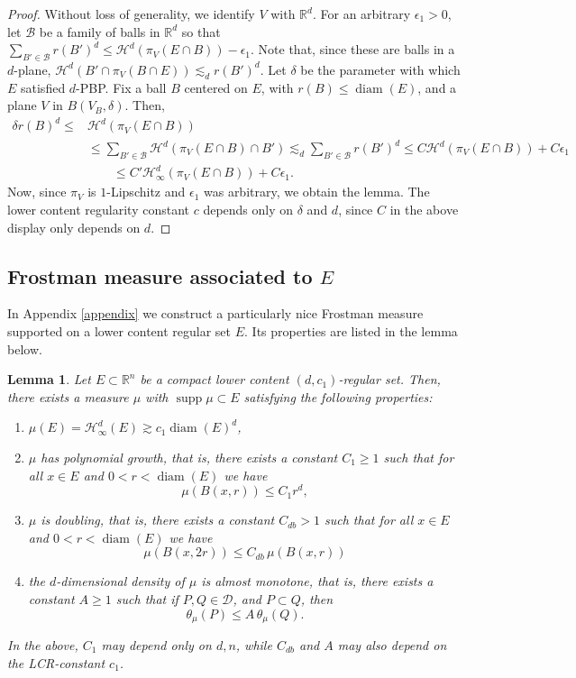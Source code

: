 \documentclass[11pt,reqno]{amsart}
\def\dB{{\mathcal{B}}}
\def\ve{\epsilon} %
\DeclareMathOperator{\diam}{diam}
\newtheorem{lemma}[theorem]{Lemma}
\theoremstyle{definition}
\theoremstyle{remark}
\numberwithin{equation}{section}
\newcommand{\R}{\mathbb{R}}
\newcommand{\hd}{\mathcal{H}^d}
\newcommand{\hdc}{\mathcal{H}^d_\infty}
\newcommand{\DD}{\mathcal{D}}
\DeclareMathOperator{\supp}{supp}
\theoremstyle{theorem}
\theoremstyle{definition}
\theoremstyle{remark}
\numberwithin{equation}{section}
\begin{document}
	\begin{proof}
		Without loss of generality, we identify $V$ with $\R^d$. For an arbitrary $\ve_1>0$, let $\dB$ be a family of balls in $\R^d$ so that $\sum_{B' \in \dB} r(B')^d \leq  \hd (\pi_V(E \cap B)) - \ve_1$. Note that, since these are balls in a $d$-plane, $\hd(B' \cap \pi_V(B\cap E)) \lesssim_d r(B')^d$. Let $\delta$ be the parameter with which $E$ satisfied $d$-PBP. Fix a ball $B$ centered on $E$, with $r(B) \leq \diam(E)$, and a plane $V$ in $B(V_B, \delta)$. Then, 
		\begin{align*}
		\delta r(B)^d \leq & \hd(\pi_V(E \cap B))\\
		& \leq \sum_{B' \in \dB} \hd(\pi_V(E \cap B) \cap B') \lesssim_d \sum_{B' \in \dB} r(B')^d \leq C\hd(\pi_V(E \cap B)) + C\ve_1 \\
		& \quad \quad \leq C'\hdc(\pi_V(E \cap B)) + C\ve_1. 
		\end{align*}
		Now, since $\pi_V$ is $1$-Lipschitz and $\ve_1$ was arbitrary, we obtain the lemma. The lower content regularity constant $c$ depends only on $\delta$ and $d$, since $C$ in the above display only depends on $d$. 
	\end{proof}
	\subsection{Frostman measure associated to \texorpdfstring{$E$}{E}}
	In Appendix \ref{appendix} we construct a particularly nice Frostman measure supported on a lower content regular set $E$. Its properties are listed in the lemma below.
	\begin{lemma}\label{lem:Frostman measure}
		Let $E\subset\R^n$ be a compact lower content $(d, c_1)$-regular set. Then, there exists a measure $\mu$ with $\supp\mu\subset E$ satisfying the following properties:
		\begin{enumerate}
			\item $\mu(E) = \hdc(E)\gtrsim c_1\diam(E)^d$,
			\item $\mu$ has polynomial growth, that is, there exists a constant $C_1\ge 1$ such that for all $x\in E$ and $0<r<\diam(E)$ we have
			\begin{equation*}
			\mu(B(x,r))\le C_1 r^d,
			\end{equation*}
			\item $\mu$ is doubling, that is, there exists a constant $C_{db}>1$ such that for all $x\in E$ and $0<r<\diam(E)$ we have
			\begin{equation}\label{eq:doubling}
			\mu(B(x,2r))\le C_{db}\, \mu(B(x,r))
			\end{equation}
			\item \label{it:density}the $d$-dimensional density of $\mu$ is almost monotone, that is, there exists a constant $A\ge 1$ such that if $P, Q\in\DD$, and $P\subset Q$, then
			\begin{equation*}
			\theta_\mu(P)\le A\, \theta_\mu(Q).
			\end{equation*} 
		\end{enumerate}
		In the above, $C_1$ may depend only on $d,n$, while $C_{db}$ and $A$ may also depend on the LCR-constant $c_1$.
	\end{lemma}
			
\end{document}
